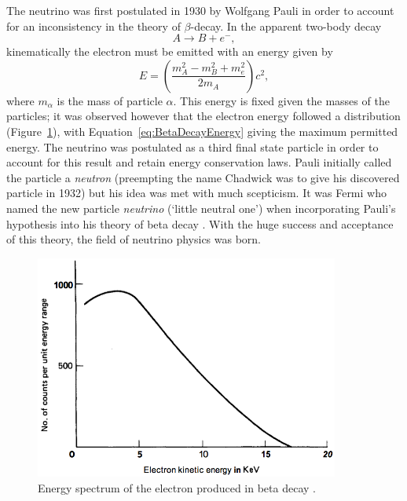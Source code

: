 The neutrino was first postulated in 1930 by Wolfgang Pauli \cite{Pauli1930} in order to account for an inconsistency in the theory of $\beta$-decay.  In the apparent two-body decay
\begin{equation}
A \rightarrow B + e^-,
\end{equation}
kinematically the electron must be emitted with an energy given by
\begin{equation}\label{eq:BetaDecayEnergy}
E = \left( \frac{m_A^2 - m_B^2 + m_e^2}{2m_A} \right) c^2,
\end{equation}
where $m_{\alpha}$ is the mass of particle $\alpha$.  This energy is fixed given the masses of the particles; it was observed however that the electron energy followed a distribution (Figure~\ref{fig:BetaDecayEnergy}), with Equation~\ref{eq:BetaDecayEnergy} giving the maximum permitted energy.  The neutrino was postulated as a third final state particle in order to account for this result and retain energy conservation laws.  Pauli initially called the particle a \textit{neutron} (preempting the name Chadwick was to give his discovered particle in 1932) but his idea was met with much scepticism.  It was Fermi who named the new particle \textit{neutrino} (`little neutral one') when incorporating Pauli's hypothesis into his theory of beta decay \cite{Fermi1934Italian,Fermi1934German,Wilson1968}.  With the huge success and acceptance of this theory, the field of neutrino physics was born.

\begin{figure}
  \centering
  \includegraphics[width=10cm]{ElectronEnergySpectrumBetaDecay.png}
  \caption[Energy spectrum of the electron produced in beta decay.]{Energy spectrum of the electron produced in beta decay \cite{Lewis1970}.}
  \label{fig:BetaDecayEnergy}
\end{figure}

